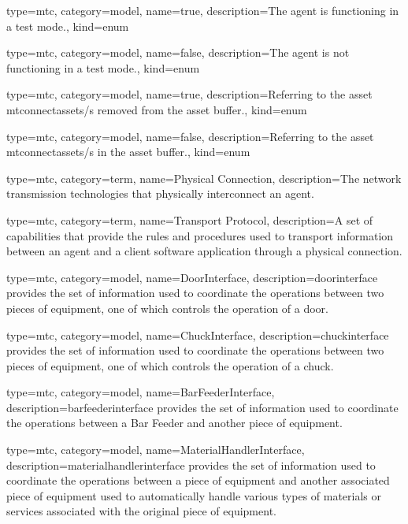 {
  type=mtc,
  category=model,
  name={true},
  description={The \gls{agent} is functioning in a test mode.},
  kind={enum}
}

{
  type=mtc,
  category=model,
  name={false},
  description={The \gls{agent} is not functioning in a test mode.},
  kind={enum}
}

{
  type=mtc,
  category=model,
  name={true},
  description={Referring to the \gls{asset mtconnectassets}/s removed from the \gls{asset buffer}.},
  kind={enum}
}

{
  type=mtc,
  category=model,
  name={false},
  description={Referring to the \gls{asset mtconnectassets}/s in the \gls{asset buffer}.},
  kind={enum}
}

{
  type=mtc,
  category=term,
  name={Physical Connection},
  description={The network transmission technologies that physically interconnect an \gls{agent}.}
}

{
  type=mtc,
  category=term,
  name={Transport Protocol},
  description={A set of capabilities that provide the rules and procedures used to transport information between an \gls{agent} and a client software application through a \gls{physical connection}.}
}

{
  type=mtc,
  category=model,
  name={DoorInterface},
  description={\gls{doorinterface} provides the set of information used to coordinate the operations between two pieces of equipment, one of which controls the operation of a door. }
}


{
  type=mtc,
  category=model,
  name={ChuckInterface},
  description={\gls{chuckinterface} provides the set of information used to coordinate the operations between two pieces of equipment, one of which controls the operation of a chuck.  }
}


{
  type=mtc,
  category=model,
  name={BarFeederInterface},
  description={\gls{barfeederinterface} provides the set of information used to coordinate the operations between a Bar Feeder and another piece of equipment.  }
}


{
  type=mtc,
  category=model,
  name={MaterialHandlerInterface},
  description={\gls{materialhandlerinterface} provides the set of information used to coordinate the operations between a piece of equipment and another associated piece of equipment used to automatically handle various types of materials or services associated with the original piece of equipment. }
}


